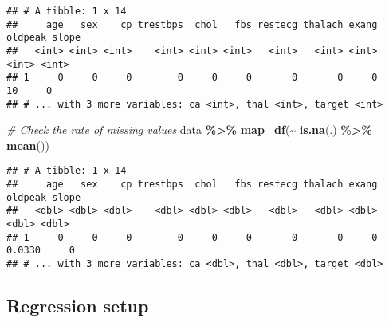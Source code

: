 \documentclass[
]{book}
\newenvironment{Shaded}{\begin{snugshade}}{\end{snugshade}}
\newcommand{\CommentTok}[1]{\textcolor[rgb]{0.56,0.35,0.01}{\textit{#1}}}
\newcommand{\DataTypeTok}[1]{\textcolor[rgb]{0.13,0.29,0.53}{#1}}
\newcommand{\DecValTok}[1]{\textcolor[rgb]{0.00,0.00,0.81}{#1}}
\newcommand{\KeywordTok}[1]{\textcolor[rgb]{0.13,0.29,0.53}{\textbf{#1}}}
\newcommand{\NormalTok}[1]{#1}
\newcommand{\OperatorTok}[1]{\textcolor[rgb]{0.81,0.36,0.00}{\textbf{#1}}}
\newcommand{\OtherTok}[1]{\textcolor[rgb]{0.56,0.35,0.01}{#1}}
\newcommand{\StringTok}[1]{\textcolor[rgb]{0.31,0.60,0.02}{#1}}
\begin{document}
\begin{Shaded}
\end{Shaded}

\begin{verbatim}
## # A tibble: 1 x 14
##     age   sex    cp trestbps  chol   fbs restecg thalach exang oldpeak slope
##   <int> <int> <int>    <int> <int> <int>   <int>   <int> <int>   <int> <int>
## 1     0     0     0        0     0     0       0       0     0      10     0
## # ... with 3 more variables: ca <int>, thal <int>, target <int>
\end{verbatim}

\begin{Shaded}
\begin{Highlighting}[]
\CommentTok{\# Check the rate of missing values}
\NormalTok{data }\OperatorTok{\%\textgreater{}\%}
\StringTok{  }\KeywordTok{map\_df}\NormalTok{(}\OperatorTok{\textasciitilde{}}\StringTok{ }\KeywordTok{is.na}\NormalTok{(.) }\OperatorTok{\%\textgreater{}\%}\StringTok{ }\KeywordTok{mean}\NormalTok{())}
\end{Highlighting}
\end{Shaded}

\begin{verbatim}
## # A tibble: 1 x 14
##     age   sex    cp trestbps  chol   fbs restecg thalach exang oldpeak slope
##   <dbl> <dbl> <dbl>    <dbl> <dbl> <dbl>   <dbl>   <dbl> <dbl>   <dbl> <dbl>
## 1     0     0     0        0     0     0       0       0     0  0.0330     0
## # ... with 3 more variables: ca <dbl>, thal <dbl>, target <dbl>
\end{verbatim}

\hypertarget{regression-setup}{%
\subsection{Regression setup}\label{regression-setup}}
\end{document}
